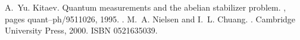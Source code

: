\documentclass[letterpaper,10pt,english]{jupyterBook}
\begin{document}
\begin{sphinxthebibliography}{10}
\sphinxAtStartPar
A. Yu. Kitaev. Quantum measurements and the abelian stabilizer problem. , pages quant–ph/9511026, 1995. .
\sphinxAtStartPar
M. A. Nielsen and I. L. Chuang. . Cambridge University Press, 2000. ISBN 0\sphinxhyphen{}521\sphinxhyphen{}63503\sphinxhyphen{}9.
\end{sphinxthebibliography}







\renewcommand{\indexname}{Index}
\printindex
\end{document}
